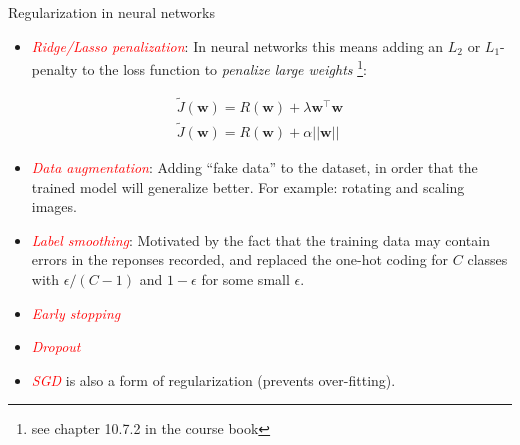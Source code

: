 \documentclass[
  10pt,
  ignorenonframetext,
  twocolumn]{beamer}
\providecommand{\tightlist}{%
  \setlength{\itemsep}{0pt}\setlength{\parskip}{0pt}}
\begin{document}
\begin{frame}
\begin{block}{Regularization in neural networks}
\label{regularization-in-neural-networks}
\(~\)

\begin{itemize}
\tightlist
\item
  \emph{\textcolor{red}{Ridge/Lasso penalization}}: In neural networks
  this means adding an \(L_2\) or \(L_1\)-penalty to the loss function
  to \emph{penalize large weights}
  \footnote{see chapter 10.7.2 in the course book}:
\end{itemize}

\begin{align*} \tilde{J}({\boldsymbol w})= R({\boldsymbol w}) + \lambda{{\boldsymbol w}^\top{\boldsymbol w}}  \\
 \tilde{J}({\boldsymbol w})= R({\boldsymbol w}) + \alpha ||{\boldsymbol w}||
\end{align*}

\vspace{2mm}

\begin{itemize}
\tightlist
\item
  \emph{\textcolor{red}{Data augmentation}}: Adding ``fake data'' to the
  dataset, in order that the trained model will generalize better. For
  example: rotating and scaling images.
\end{itemize}

\vspace{2mm}

\begin{itemize}
\tightlist
\item
  \emph{\textcolor{red}{Label smoothing}}: Motivated by the fact that
  the training data may contain errors in the reponses recorded, and
  replaced the one-hot coding for \(C\) classes with \(\epsilon/(C-1)\)
  and \(1-\epsilon\) for some small \(\epsilon\).
\end{itemize}

\vspace{2mm}

\begin{itemize}
\tightlist
\item
  \emph{\textcolor{red}{Early stopping}}
\end{itemize}

\vspace{2mm}

\begin{itemize}
\tightlist
\item
  \emph{\textcolor{red}{Dropout}}
\end{itemize}

\vspace{2mm}

\begin{itemize}
\tightlist
\item
  \emph{\textcolor{red}{SGD}} is also a form of regularization (prevents
  over-fitting).
\end{itemize}
\end{block}
\end{frame}
\end{document}

